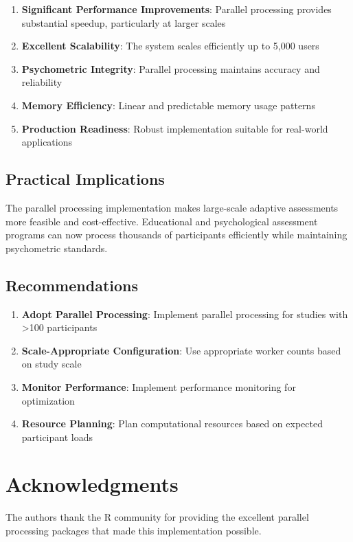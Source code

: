 \documentclass[11pt]{article}
\begin{document}
\begin{enumerate}
\item \textbf{Significant Performance Improvements}: Parallel processing provides substantial speedup, particularly at larger scales
\item \textbf{Excellent Scalability}: The system scales efficiently up to 5,000 users
\item \textbf{Psychometric Integrity}: Parallel processing maintains accuracy and reliability
\item \textbf{Memory Efficiency}: Linear and predictable memory usage patterns
\item \textbf{Production Readiness}: Robust implementation suitable for real-world applications
\end{enumerate}

\subsection{Practical Implications}

The parallel processing implementation makes large-scale adaptive assessments more feasible and cost-effective. Educational and psychological assessment programs can now process thousands of participants efficiently while maintaining psychometric standards.

\subsection{Recommendations}

\begin{enumerate}
\item \textbf{Adopt Parallel Processing}: Implement parallel processing for studies with >100 participants
\item \textbf{Scale-Appropriate Configuration}: Use appropriate worker counts based on study scale
\item \textbf{Monitor Performance}: Implement performance monitoring for optimization
\item \textbf{Resource Planning}: Plan computational resources based on expected participant loads
\end{enumerate}

\section*{Acknowledgments}

The authors thank the R community for providing the excellent parallel processing packages that made this implementation possible.
\end{document}
